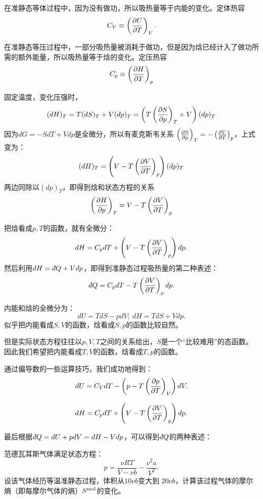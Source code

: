 \documentclass[CJK]{beamer}
\begin{document}
\begin{frame}
\bchL
在{\blue 准静态等体过程}中，因为没有做功，所以{\blue 吸热量等于内能的变化}。定体热容
$$C_V \equiv \left(\frac{\partial U}{\partial T}\right)_{V}. $$

在{\blue 准静态等压过程}中，一部分吸热量被消耗于做功，但是因为焓已经计入了做功所需的额外能量，所以{\blue 吸热量等于焓的变化}。定压热容
$$ C_p \equiv \left(\frac{\partial H}{\partial T}\right)_{p} $$
\echL
\end{frame}


\begin{frame}
\bch

固定温度，变化压强时，
$$ (dH)_T = T(dS)_T + V(dp)_T = \left( T\left(\frac{\partial S}{\partial p}\right)_{T} + V\right) (dp)_T$$
因为$d G = - SdT + Vdp$是全微分，所以有麦克斯韦关系 $ \left(\frac{\partial S}{\partial p}\right)_{T} = - \left(\frac{\partial V}{\partial T}\right)_{p}$，上式变为：
$$ (dH)_T = \left( V - T\left(\frac{\partial V}{\partial T}\right)_{p}\right) (dp)_T$$
两边同除以$(dp)_T$，即得到{\blue 焓和状态方程的关系
$$\left(\frac{\partial H}{\partial p}\right)_{T} = V - T\left(\frac{\partial V}{\partial T}\right)_{p}$$  
}

\ech
\end{frame}


\begin{frame}
\bchL
把焓看成$p, T$的函数，就有全微分：
{\blue $$ dH = C_p dT + \left(V - T\left(\frac{\partial V}{\partial T}\right)_{p}\right) dp. $$}
然后利用$ dH = \dbar Q + Vdp$，即得到{\blue 准静态过程吸热量的第二种表述：
  $$ \dbar Q = C_p dT - T\pfrac VTp dp.$$}
\echL
\end{frame}

\begin{frame}
\bchL
内能和焓的全微分为：
$$ dU = T dS - p dV; \ dH = T dS + V dp.$$
似乎把内能看成$S, V$的函数，焓看成$S, p$的函数比较自然。

\skipline

但是实际状态方程往往以$p,V,T$之间的关系给出，$S$是一个“比较难用”的态函数。因此我们希望把内能看成$T, V$的函数，焓看成$T, p$的函数。
\echL
\end{frame}

\begin{frame}
\bchL
通过偏导数的一些运算技巧，我们成功地得到：
{\blue $$ dU = C_V dT  - \left(p - T\left(\frac{\partial p}{\partial T}\right)_{V} \right) dV. $$}

{\blue $$ dH = C_p dT + \left(V - T\left(\frac{\partial V}{\partial T}\right)_{p}\right) dp. $$}
\echL
\end{frame}

\begin{frame}
\bchL
最后根据$ \dbar Q = dU + pdV = dH - Vdp $，可以得到$\dbar Q$的两种表述：
\echL
\end{frame}



\begin{frame}
\bchL
范德瓦耳斯气体满足状态方程：
$$ p = \frac{\nu R T}{V-\nu b} - \frac{\nu^2a}{V^2}. $$ 
设该气体经历等温准静态过程，体积从$10\nu b$变大到 $20\nu b$，计算该过程气体的摩尔熵（即每摩尔气体的熵）$S^{\rm mol}$的变化。
\echL
\end{frame}
\end{document}
